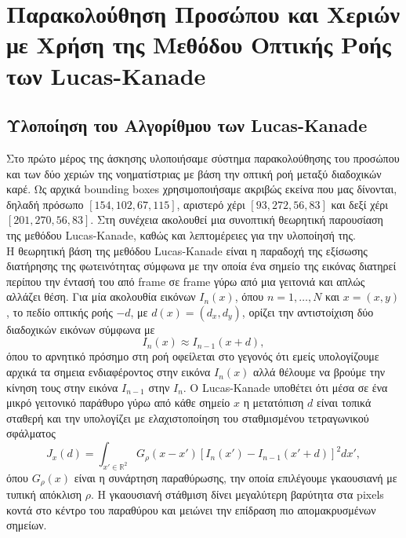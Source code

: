 \documentclass[12pt, a4paper]{article}
\begin{document}
\tableofcontents
\clearpage

\section{Παρακολούθηση Προσώπου και Χεριών με Χρήση της Μεθόδου Οπτικής Ροής των Lucas-Kanade}

\subsection{Υλοποίηση του Αλγορίθμου των Lucas-Kanade}

Στο πρώτο μέρος της άσκησης υλοποιήσαμε σύστημα παρακολούθησης του προσώπου και των δύο χεριών της νοηματίστριας
με βάση την οπτική ροή μεταξύ διαδοχικών καρέ. Ως αρχικά bounding boxes χρησιμοποιήσαμε ακριβώς εκείνα που μας δίνονται,
 δηλαδή πρόσωπο $[154,102,67,115]$, αριστερό χέρι $[93,272,56,83]$ και δεξί χέρι $[201,270,56,83]$.
Στη συνέχεια ακολουθεί μια συνοπτική θεωρητική παρουσίαση της μεθόδου Lucas-Kanade, καθώς και λεπτομέρειες για την υλοποίησή της.\\
Η θεωρητική βάση της μεθόδου Lucas-Kanade είναι η παραδοχή της εξίσωσης διατήρησης της φωτεινότητας σύμφωνα με την οποία ένα σημείο της εικόνας
 διατηρεί περίπου την έντασή του από frame σε frame γύρω από μια γειτονιά και απλώς αλλάζει θέση. Για μία ακολουθία εικόνων $I_n(x)$, όπου $n=1,\dots,N$ και $x=(x,y)$, το πεδίο οπτικής ροής $-d$, με $d(x)=(d_x,d_y)$, ορίζει την αντιστοίχιση δύο διαδοχικών εικόνων σύμφωνα με
\begin{equation}
I_n(x) \approx I_{n-1}(x+d),
\end{equation}
όπου το αρνητικό πρόσημο στη ροή οφείλεται στο γεγονός ότι εμείς υπολογίζουμε αρχικά τα σημεια ενδιαφέροντος στην εικόνα $I_n(x)$ αλλά θέλουμε να βρούμε την κίνηση τους στην εικόνα $I_{n-1}$ στην $I_n$. Ο Lucas-Kanade υποθέτει ότι μέσα σε ένα μικρό γειτονικό παράθυρο γύρω από κάθε σημείο $x$ η μετατόπιση $d$ είναι τοπικά σταθερή και την υπολογίζει με ελαχιστοποίηση του σταθμισμένου τετραγωνικού σφάλματος
\begin{equation}
J_x(d)=\int_{x' \in \mathbb{R}^2} G_\rho(x-x')
\left[I_n(x')-I_{n-1}(x'+d)\right]^2 dx',
\end{equation}
όπου $G_\rho(x)$ είναι η συνάρτηση παραθύρωσης, την οποία επιλέγουμε γκαουσιανή με τυπική απόκλιση $\rho$. Η γκαουσιανή στάθμιση δίνει μεγαλύτερη βαρύτητα στα pixels κοντά στο κέντρο του παραθύρου και μειώνει την επίδραση πιο απομακρυσμένων σημείων.
\end{document}
